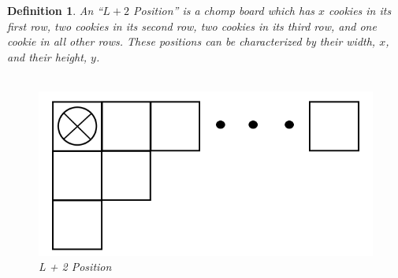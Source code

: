 \documentclass{amsart}
\newtheorem{term}{Definition} %
\theoremstyle{definition}
\theoremstyle{remark}
\numberwithin{equation}{section}
\begin{document}
\begin{term}
An ``$L+2$ Position'' is a chomp board which has $x$ cookies in its first row, two cookies in its second row, two cookies in its third row, and one cookie in all other rows. These positions can be characterized by their width, $x$, and their height, $y$.\\ 
\\
\begin{figure}[Lplus2]
\includegraphics[scale=0.25]{Images/Lplus2_v2.png}
\caption{L + 2 Position}
\end{figure}
\end{term}
\end{document}

